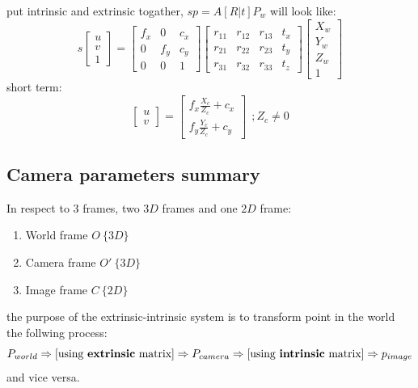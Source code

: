 \documentclass{article}
\begin{document}
put intrinsic and extrinsic togather, $sp=A\left[R|t\right]P_w$ will look like:
$$
s\begin{bmatrix}
u\\v\\1
\end{bmatrix}=
\begin{bmatrix}
f_x & 0 & c_x\\
0 & f_y & c_y\\
0 & 0 & 1
\end{bmatrix}
\begin{bmatrix}
r_11 & r_12 & r_13 & t_x \\
r_21 & r_22 & r_23 & t_y \\
r_31 & r_32 & r_33 & t_z 
\end{bmatrix}
\begin{bmatrix}
X_w\\Y_w\\Z_w\\1
\end{bmatrix}
$$
short term:
$$
\begin{bmatrix}
u\\v
\end{bmatrix} = 
\begin{bmatrix}
f_x\frac{X_c}{Z_c} + c_x\\
f_y\frac{Y_c}{Z_c} + c_y
\end{bmatrix}
\:\:; Z_c\neq0
$$

\subsection{Camera parameters summary}
In respect to 3 frames, two $3D$ frames and one $2D$ frame:
\begin{enumerate}
	\item World frame $O \: \lbrace3D\rbrace$ 
	\item Camera frame $O' \: \lbrace3D\rbrace$
	\item Image frame $C  \: \lbrace2D\rbrace$
\end{enumerate}
the purpose of the extrinsic-intrinsic system is to transform point in the world the follwing process:
$$ P_{world} \Rightarrow \left[\textrm{using \textbf{extrinsic} matrix}\right] \Rightarrow P_{camera} \Rightarrow \left[\textrm{using \textbf{intrinsic} matrix}\right] \Rightarrow p_{image} $$ 
and vice versa.


\newpage
\end{document}
